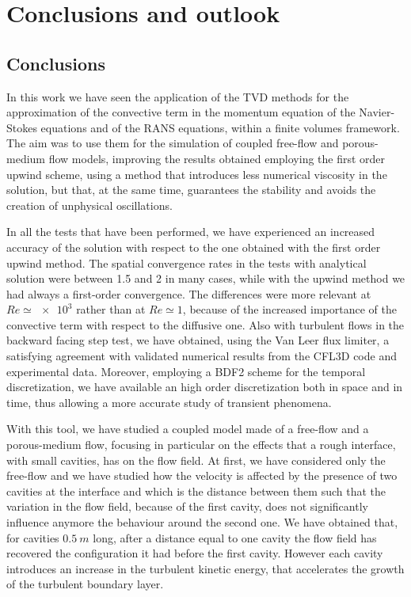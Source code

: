 \chapter{Conclusions and outlook}
\section{Conclusions}
In this work we have seen the application of the TVD methods for the 
approximation of the convective term in the momentum equation of the 
Navier-Stokes equations and of the RANS equations, within a finite volumes 
framework. The aim was to use them for the simulation of coupled free-flow and 
porous-medium flow models, improving the results obtained employing the 
first order upwind scheme, using a method that introduces less numerical 
viscosity in the solution, but that, at the same time, guarantees the stability 
and avoids the creation of unphysical oscillations.

In all the tests that have been performed, we have experienced an increased 
accuracy of the solution with respect to the one obtained with the first order 
upwind method. The spatial convergence rates in the tests with analytical 
solution were between 1.5 and 2 in many cases, while with the upwind method we had always a first-order convergence. 
The differences were more relevant at $Re\simeq\num{e3}$ rather than at 
$Re\simeq1$, because of the increased importance of the convective term with 
respect to the diffusive one. Also with turbulent flows in the backward facing 
step test, we have 
obtained, using the Van Leer flux limiter, a satisfying agreement with 
validated numerical results from the CFL3D code and experimental data.
Moreover, employing a BDF2 scheme for the 
temporal discretization, we have available an high order discretization both 
in space and in time, thus allowing a more accurate study of transient 
phenomena.

With this tool, we have studied a coupled model made of a free-flow and a 
porous-medium flow, focusing in particular on the effects that a rough
interface, with small cavities, has on the flow field.
At first, we have considered only the free-flow and we have studied how the 
velocity is affected by the presence of two cavities at the interface and 
which is the distance between them such that the variation in the flow field, 
because of the first cavity, does not significantly influence anymore the 
behaviour around the 
second one. We have obtained that, for cavities $\SI{0.5}{m}$ long, after a 
distance equal to one cavity the flow field has recovered the configuration it 
had before the first cavity. However each cavity introduces an increase in the 
turbulent kinetic energy, that accelerates the growth of the turbulent 
boundary layer.

